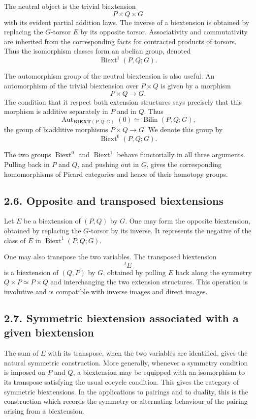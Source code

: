 \documentclass[11pt]{article}
\theoremstyle{plain}
\theoremstyle{definition}
\theoremstyle{remark}
\DeclareMathOperator{\Biext}{Biext}
\newcommand{\BIEXT}{\mathbf{BIEXT}}\newcommand{\GRAB}{\mathbf{GRAB}}
\begin{document}
The neutral object is the trivial biextension
\[
P\times Q\times G
\]
with its evident partial addition laws. The inverse of a biextension is obtained
by replacing the \(G\)-torsor \(E\) by its opposite torsor. Associativity and
commutativity are inherited from the corresponding facts for contracted products
of torsors. Thus the isomorphism classes form an abelian group, denoted
\[
\Biext^1(P,Q;G).
\]

The automorphism group of the neutral biextension is also useful. An automorphism
of the trivial biextension over \(P\times Q\) is given by a morphism
\[
P\times Q\longrightarrow G.
\]
The condition that it respect both extension structures says precisely that this
morphism is additive separately in \(P\) and in \(Q\). Thus
\[
\operatorname{Aut}_{\BIEXT(P,Q;G)}(0)
        \simeq \operatorname{Bilin}(P,Q;G),
\]
the group of biadditive morphisms \(P\times Q\to G\). We denote this group by
\[
\Biext^0(P,Q;G).
\]

The two groups \(\Biext^0\) and \(\Biext^1\) behave functorially in all three
arguments. Pulling back in \(P\) and \(Q\), and pushing out in \(G\), gives the
corresponding homomorphisms of Picard categories and hence of their homotopy
groups.

\subsection*{2.6. Opposite and transposed biextensions}

Let \(E\) be a biextension of \((P,Q)\) by \(G\). One may form the opposite
biextension, obtained by replacing the \(G\)-torsor by its inverse. It represents
the negative of the class of \(E\) in \(\Biext^1(P,Q;G)\).

One may also transpose the two variables. The transposed biextension
\[
{}^tE
\]
is a biextension of \((Q,P)\) by \(G\), obtained by pulling \(E\) back along the
symmetry \(Q\times P\simeq P\times Q\) and interchanging the two extension
structures. This operation is involutive and is compatible with inverse images
and direct images.

\subsection*{2.7. Symmetric biextension associated with a given biextension}

The sum of \(E\) with its transpose, when the two variables are identified, gives
the natural symmetric construction. More generally, whenever a symmetry condition
is imposed on \(P\) and \(Q\), a biextension may be equipped with an isomorphism
to its transpose satisfying the usual cocycle condition. This gives the category
of symmetric biextensions. In the applications to pairings and to duality, this
is the construction which records the symmetry or alternating behaviour of the
pairing arising from a biextension.
\end{document}
